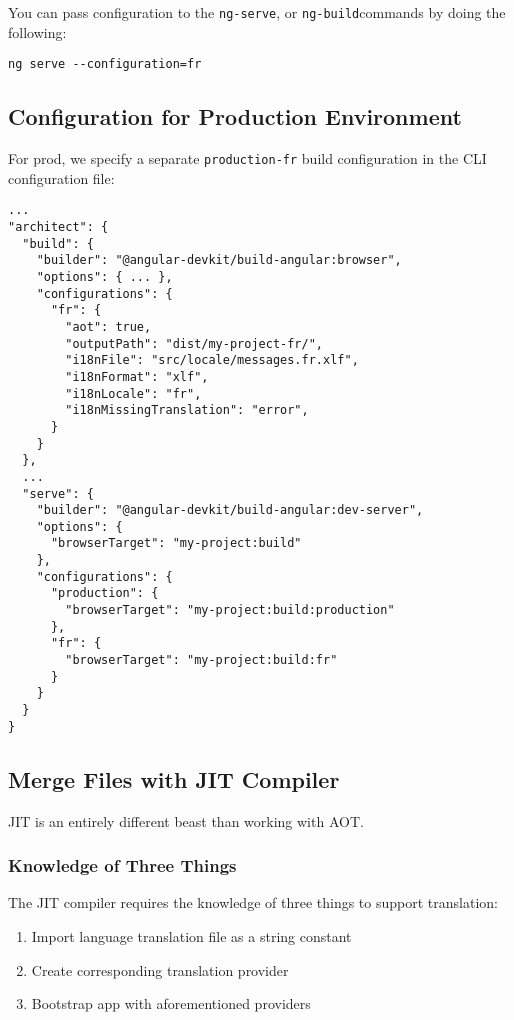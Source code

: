 You can pass configuration to the \lstinline{ng-serve}, or \lstinline{ng-build}commands by doing the following: 
\begin{verbatim}
ng serve --configuration=fr
\end{verbatim}

\subsection{Configuration for Production Environment}
For prod, we specify a separate \lstinline{production-fr} build configuration in the CLI configuration file: 
\begin{lstlisting}[caption=angular.json]
...
"architect": {
  "build": {
    "builder": "@angular-devkit/build-angular:browser",
    "options": { ... },
    "configurations": {
      "fr": {
        "aot": true,
        "outputPath": "dist/my-project-fr/",
        "i18nFile": "src/locale/messages.fr.xlf",
        "i18nFormat": "xlf",
        "i18nLocale": "fr",
        "i18nMissingTranslation": "error",
      }
    }
  },
  ...
  "serve": {
    "builder": "@angular-devkit/build-angular:dev-server",
    "options": {
      "browserTarget": "my-project:build"
    },
    "configurations": {
      "production": {
        "browserTarget": "my-project:build:production"
      },
      "fr": {
        "browserTarget": "my-project:build:fr"
      }
    }
  }
}  
\end{lstlisting}

\subsection{Merge Files with JIT Compiler}
JIT is an entirely different beast than working with AOT. 


\subsubsection{ Knowledge of Three Things }
The JIT compiler requires the knowledge of three things to support translation: 
\begin{enumerate}
  \item Import language translation file as a string constant
  \item Create corresponding translation provider
  \item Bootstrap app with aforementioned providers
\end{enumerate}

